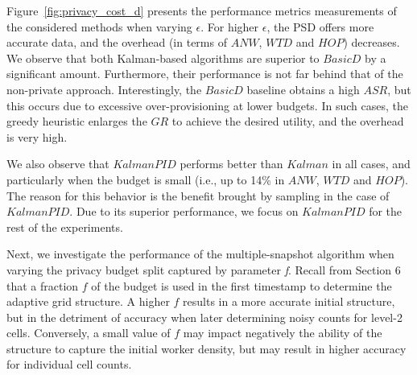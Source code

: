 \documentclass{USC-Thesis}
\numberwithin{equation}{chapter}
\begin{document}
Figure~\ref{fig:privacy_cost_d} presents the performance metrics measurements of the considered methods when varying $\epsilon$. For higher $\epsilon$, the PSD offers more accurate data, and the overhead (in terms of $\mathit{ANW}$, $\mathit{WTD}$ and $\mathit{HOP}$) decreases. We observe that both Kalman-based algorithms are superior to $\mathit{BasicD}$ by a significant amount. Furthermore, their performance is not far behind that of the non-private approach. Interestingly, the $\mathit{BasicD}$ baseline obtains a high $\mathit{ASR}$, but this occurs due to excessive over-provisioning at lower budgets. In such cases, the greedy heuristic enlarges the $\mathit{GR}$ to achieve the desired utility, and the overhead is very high.

We also observe that $\mathit{KalmanPID}$ performs better than $\mathit{Kalman}$ in all cases, and particularly when the budget is small (i.e., up to 14\% in $\mathit{ANW}$, $\mathit{WTD}$ and $\mathit{HOP}$). 
The reason for this behavior is the benefit brought by sampling in the case of $\mathit{KalmanPID}$. 
Due to its superior performance, we focus on $\mathit{KalmanPID}$ for the rest of the experiments.


Next, we investigate the performance of the multiple-snapshot algorithm when varying the privacy budget split captured by parameter {\em f}. Recall from Section 6 that a fraction $f$ of the budget is used in the first timestamp to determine the adaptive grid structure. A higher $f$ results in a more accurate initial structure, but in the detriment of accuracy when later determining noisy counts for level-2 cells. Conversely, a small value of $f$ may impact negatively the ability of the structure to capture the initial worker density, but may result in higher accuracy for individual cell counts.
\end{document}
